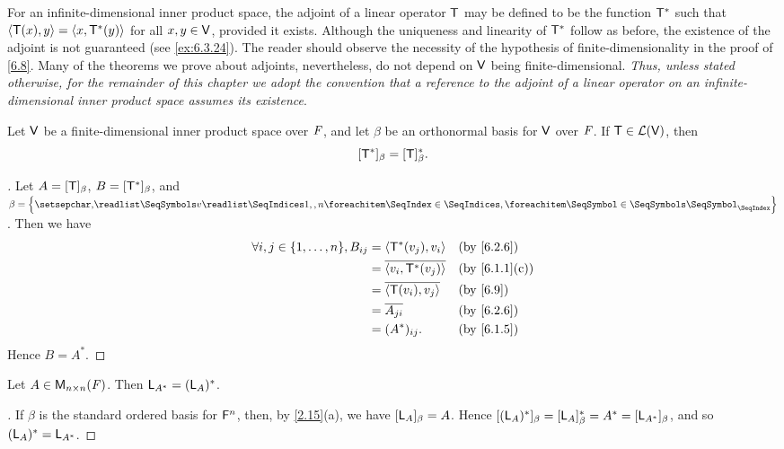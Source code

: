 \begin{note}
	For an infinite-dimensional inner product space, the adjoint of a linear operator \(\mathsf{T}\) may be defined to be the function \(\mathsf{T}^*\) such that \(\left\langle\mathsf{T}(x), y\right\rangle = \left\langle x, \mathsf{T}^*(y)\right\rangle\) for all \(x, y \in \mathsf{V}\), provided it exists.
	Although the uniqueness and linearity of \(\mathsf{T}^*\) follow as before, the existence of the adjoint is not guaranteed (see \cref{ex:6.3.24}).
	The reader should observe the necessity of the hypothesis of finite-dimensionality in the proof of \cref{6.8}.
	Many of the theorems we prove about adjoints, nevertheless, do not depend on \(\mathsf{V}\) being finite-dimensional.
	\emph{Thus, unless stated otherwise, for the remainder of this chapter we adopt the convention that a reference to the adjoint of a linear operator on an infinite-dimensional inner product space assumes its existence}.
\end{note}

\begin{thm}\label{6.10}
	Let \(\mathsf{V}\) be a finite-dimensional inner product space over \(\mathit{F}\), and let \(\beta\) be an orthonormal basis for \(\mathsf{V}\) over \(\mathit{F}\).
	If \(\mathsf{T} \in \mathcal{L}(\mathsf{V})\), then
	\[
		[\mathsf{T}^*]_{\beta} = [\mathsf{T}]_{\beta}^*.
	\]
\end{thm}

\begin{proof}[]
	Let \(A = [\mathsf{T}]_{\beta}\), \(B = [\mathsf{T}^*]_{\beta}\), and \(\beta = \set{\seq{v}{1,,n}}\).
	Then we have
	\begin{align*}
		\forall i, j \in \set{1, \dots, n}, B_{i j} & = \inn{\T^*(v_j), v_i}        &  & \by{6.2.6}    \\
		                                            & = \conj{\inn{v_i, \T^*(v_j)}} &  & \by{6.1.1}[c] \\
		                                            & = \conj{\inn{\T(v_i), v_j}}   &  & \by{6.9}      \\
		                                            & = \conj{A_{j i}}              &  & \by{6.2.6}    \\
		                                            & = (A^*)_{i j}.                &  & \by{6.1.5}
	\end{align*}
	Hence \(B = A^*\).
\end{proof}

\begin{cor}\label{6.3.1}
	Let \(A \in \ms[n][n][\F]\).
	Then \(\mathsf{L}_{A^*} = (\mathsf{L}_A)^*\).
\end{cor}

\begin{proof}[]
	If \(\beta\) is the standard ordered basis for \(\mathsf{F}^n\), then, by \cref{2.15}(a), we have \([\mathsf{L}_A]_{\beta} = A\).
	Hence \([(\mathsf{L}_A)^*]_{\beta} = [\mathsf{L}_A]_{\beta}^* = A^* = [\mathsf{L}_{A^*}]_{\beta}\), and so \((\mathsf{L}_A)^* = \mathsf{L}_{A^*}\).
\end{proof}

